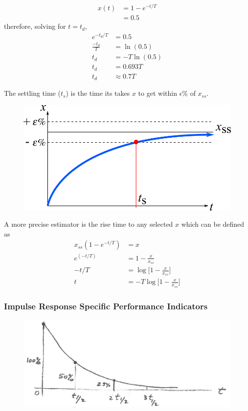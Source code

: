 \documentclass[12pt,letter]{article}
\begin{document}
\begin{align}
x(t) &= 1-e^{-t/T} \\
&= 0.5 \nonumber
\end{align}
therefore, solving for $t=t_d$,
\begin{align}
e^{-t_d/T} &= 0.5 \\
\frac{-t_d}{T} &= \ln(0.5) \nonumber \\
t_d &= -T \ln(0.5) \nonumber \\
t_d &= 0.693 T \nonumber \\
t_d & \approx 0.7T \nonumber 
\end{align}

The settling time ($t_s$) is the time its takes $x$ to get within $\epsilon \%$ of $x_{ss}$.
\begin{figure}[H]
	\centering
	\includegraphics[]{../figures/performance_indicator_settling_time}
\end{figure}

A more precise estimator is the rise time to any selected $x$ which can be defined as
\begin{align}
x_{ss}(1-e^{-t/T})&=x \\
 e^{(-t/T)} &= 1-\frac{x}{x_{ss}} \nonumber \\ 
-t/T &= \log \bigg[ 1-\frac{x}{x_{ss}} \bigg]  \nonumber \\ 
t &= -T \log \bigg[ 1-\frac{x}{x_{ss}} \bigg] \nonumber 
\end{align}

\subsubsection{Impulse Response Specific Performance Indicators}

\begin{figure}[H]
	\centering
	\includegraphics[width=4.5in]{../figures/system_specific_performance_indicator_decay_time}
\end{figure}
\end{document}
